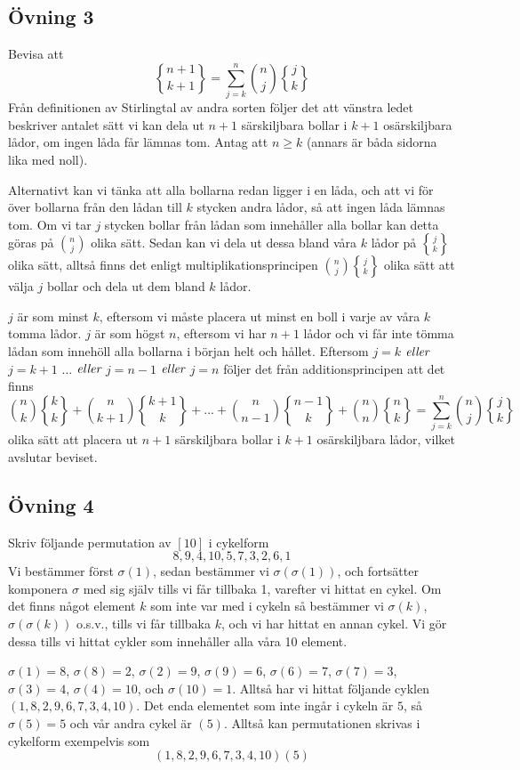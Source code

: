 \documentclass{article}
\begin{document}
\subsection*{Övning 3}
Bevisa att $$
{n + 1 \brace k + 1} = \sum _{j = k} ^{n} {n \choose j}{j \brace k}
$$
Från definitionen av Stirlingtal av andra sorten följer det att vänstra ledet beskriver antalet sätt vi kan dela ut $n + 1$ särskiljbara bollar i $k + 1$ osärskiljbara lådor, om ingen låda får lämnas tom. Antag att $n \geq k$ (annars är båda sidorna lika med noll). 

Alternativt kan vi tänka att alla bollarna redan ligger i en låda, och att vi för över bollarna från den lådan till $k$ stycken andra lådor, så att ingen låda lämnas tom. Om vi tar $j$ stycken bollar från lådan som innehåller alla bollar kan detta göras på $n \choose j$ olika sätt. Sedan kan vi dela ut dessa bland våra $k$ lådor på $j \brace k$ olika sätt, alltså finns det enligt multiplikationsprincipen $ {n \choose j}{j \brace k}$ olika sätt att välja $j$ bollar och dela ut dem bland $k$ lådor.

$j$ är som minst $k$, eftersom vi måste placera ut minst en boll i varje av våra $k$ tomma lådor. $j$ är som högst $n$, eftersom vi har $n + 1$ lådor och vi får inte tömma lådan som innehöll alla bollarna i början helt och hållet. Eftersom $j=k$ $\emph{eller}$ $j=k + 1$ ... $\emph{eller}$ $j= n - 1$ $\emph{eller}$ $j= n$ följer det från additionsprincipen att det finns $$
{n \choose k}{k \brace k} + {n \choose k + 1}{k + 1 \brace k} + ... + {n \choose n - 1}{n - 1\brace k} + {n \choose n}{n \brace k} =  \sum _{j = k} ^{n} {n \choose j}{j \brace k}
$$
olika sätt att placera ut $n + 1$ särskiljbara bollar i $k + 1$ osärskiljbara lådor, vilket avslutar beviset. 

\subsection*{Övning 4}
Skriv följande permutation av $[10]$ i cykelform $$
8, 9, 4, 10, 5, 7, 3, 2, 6, 1
$$
Vi bestämmer först $\sigma(1)$, sedan bestämmer vi $\sigma(\sigma(1))$, och fortsätter komponera $\sigma$ med sig själv tills vi får tillbaka 1, varefter vi hittat en cykel. Om det finns något element $k$ som inte var med i cykeln så bestämmer vi $\sigma(k)$, $\sigma(\sigma(k))$ o.s.v., tills vi får tillbaka $k$, och vi har hittat en annan cykel. Vi gör dessa tills vi hittat cykler som innehåller alla våra 10 element. 

$\sigma(1)=8$, $\sigma(8)=2$, $\sigma(2)=9$, $\sigma(9)=6$, $\sigma(6)=7$, $\sigma(7)=3$, $\sigma(3)=4$, $\sigma(4)=10$, och $\sigma(10)=1$. Alltså har vi hittat följande cyklen $(1, 8, 2, 9, 6, 7, 3, 4, 10)$. Det enda elementet som inte ingår i cykeln är $5$, så $\sigma(5)=5$ och vår andra cykel är $(5)$. Alltså kan permutationen skrivas i cykelform exempelvis som $$
(1, 8, 2, 9, 6, 7, 3, 4, 10)(5)
$$
\end{document}
